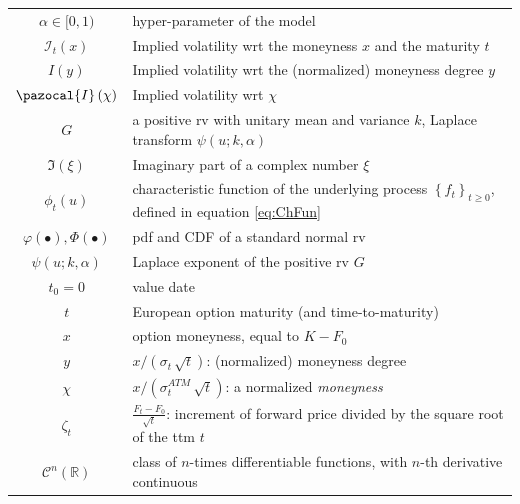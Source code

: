 \documentclass[12pt]{article}
\newcommand{\Ib}{\pazocal{I}}
\theoremstyle{definition}
\theoremstyle{remark}
\numberwithin{theorem}{section}
\numberwithin{proposition}{section}
\numberwithin{lemma}{section}
\numberwithin{corollary}{section}
\numberwithin{definition}{section}
\numberwithin{remark}{section}
\numberwithin{example}{section}
\begin{document}
\begin{tabular} {|c|l|}
		$\alpha\in[0,1)$ & hyper-parameter of the model \\
		$\mathcal{I}_t\left(x\right)$ &Implied volatility wrt the moneyness $x$ and the maturity $t$\\
            ${ I}\left(y\right)$ &Implied volatility wrt the (normalized) moneyness degree $y$ \\
		${\Ib}\left(\chi\right)$ &Implied volatility wrt $\chi$   \\
		$G$ & a positive rv with unitary mean and variance ${k}$, Laplace transform $\psi (u; k, \alpha)$ \\
		$\Im(\xi)$ & Imaginary part of a complex number $\xi$\\
		$\phi_t\left(u\right)$ & characteristic function of the underlying process $\left\{f_t\right\}_{t\geq0}$, defined in equation \eqref{eq:ChFun} \\	
		${\varphi} ( \bullet ), {\Phi} ( \bullet )$ & pdf and CDF of a standard normal rv\\
		$\psi (u; k, \alpha)$ &  Laplace exponent of the positive rv $G$\\
		$t_0=0$ & value date \\
		$t$ & European option maturity (and time-to-maturity) \\
		$x$ & option moneyness, equal to $K - F_0$\\	
            	$y$ & $x/(\sigma_t \,\sqrt{ t})$: (normalized) moneyness degree \\	
		$\chi$ & $x /(\sigma^{ATM}_t \, \sqrt{t})$: a normalized  {\it moneyness}\\	
		$\zeta_t$ & $\frac{F_t-F_0}{\sqrt{t}}$: increment of forward price divided by the square root of the ttm $t$\\	
		$\mathcal{C}^n(\mathbb{R})$ & class of $n$-times differentiable functions, with $n$-th derivative continuous \\
		\bottomrule		
	\end{tabular}
	

\bigskip 
\end{document}
